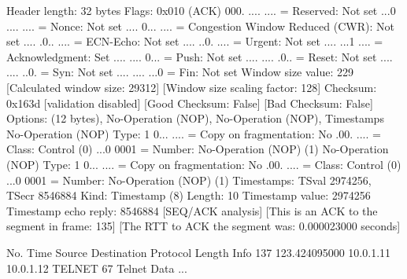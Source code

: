     Header length: 32 bytes
    Flags: 0x010 (ACK)
        000. .... .... = Reserved: Not set
        ...0 .... .... = Nonce: Not set
        .... 0... .... = Congestion Window Reduced (CWR): Not set
        .... .0.. .... = ECN-Echo: Not set
        .... ..0. .... = Urgent: Not set
        .... ...1 .... = Acknowledgment: Set
        .... .... 0... = Push: Not set
        .... .... .0.. = Reset: Not set
        .... .... ..0. = Syn: Not set
        .... .... ...0 = Fin: Not set
    Window size value: 229
    [Calculated window size: 29312]
    [Window size scaling factor: 128]
    Checksum: 0x163d [validation disabled]
        [Good Checksum: False]
        [Bad Checksum: False]
    Options: (12 bytes), No-Operation (NOP), No-Operation (NOP), Timestamps
        No-Operation (NOP)
            Type: 1
                0... .... = Copy on fragmentation: No
                .00. .... = Class: Control (0)
                ...0 0001 = Number: No-Operation (NOP) (1)
        No-Operation (NOP)
            Type: 1
                0... .... = Copy on fragmentation: No
                .00. .... = Class: Control (0)
                ...0 0001 = Number: No-Operation (NOP) (1)
        Timestamps: TSval 2974256, TSecr 8546884
            Kind: Timestamp (8)
            Length: 10
            Timestamp value: 2974256
            Timestamp echo reply: 8546884
    [SEQ/ACK analysis]
        [This is an ACK to the segment in frame: 135]
        [The RTT to ACK the segment was: 0.000023000 seconds]

No.     Time           Source                Destination           Protocol Length Info
    137 123.424095000  10.0.1.11             10.0.1.12             TELNET   67     Telnet Data ...

